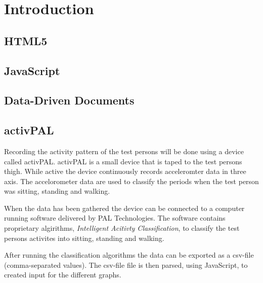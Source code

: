 \chapter{Introduction} %

\label{Chapter2} %


\section{HTML5}

\section{JavaScript}
        
\section{Data-Driven Documents}


\section{activPAL}
Recording the activity pattern of the test persons will be done using a device called activPAL. activPAL is a small device that is taped to the test persons thigh. While active the device continuously records acceleromter data in three axis. The accelorometer data are used to classify the periods when the test person was sitting, standing and walking.

When the data has been gathered the device can be connected to a computer running software delivered by PAL Technologies. The software contains proprietary algirithms, \emph{Intelligent Acitivty Classification}, to classify the test persons activites into sitting, standing and walking.


After running the classification algorithms the data can be exported as a csv-file (comma-separated values). The csv-file file is then parsed, using JavaScript, to created input for the different graphs.
